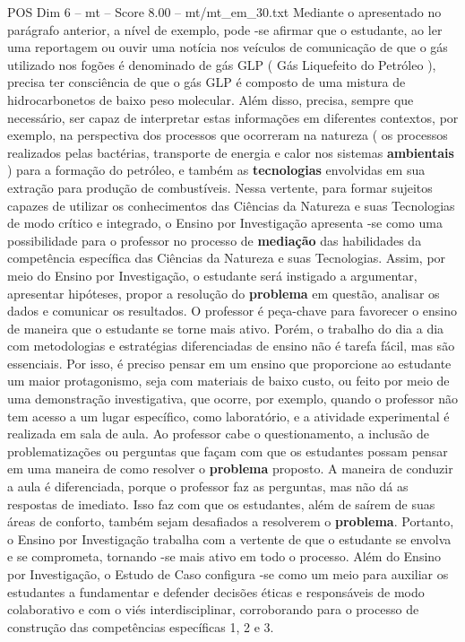 \begin{textsample}{POS Dim 6 – mt – Score 8.00 – mt/mt\_em\_30.txt}
Mediante o apresentado no parágrafo anterior, a nível de exemplo, pode -se afirmar que o estudante, ao ler uma reportagem ou ouvir uma notícia nos veículos de comunicação de que o gás utilizado nos fogões é denominado de gás GLP ( Gás Liquefeito do Petróleo ), precisa ter consciência de que o gás GLP é composto de uma mistura de hidrocarbonetos de baixo peso molecular.
Além disso, precisa, sempre que necessário, ser capaz de interpretar estas informações em diferentes contextos, por exemplo, na perspectiva dos processos que ocorreram na natureza ( os processos realizados pelas bactérias, transporte de energia e calor nos sistemas \textbf{ambientais} ) para a formação do petróleo, e também as \textbf{tecnologias} envolvidas em sua extração para produção de combustíveis.
Nessa vertente, para formar sujeitos capazes de utilizar os conhecimentos das Ciências da Natureza e suas Tecnologias de modo crítico e integrado, o Ensino por Investigação apresenta -se como uma possibilidade para o professor no processo de \textbf{mediação} das habilidades da competência específica das Ciências da Natureza e suas Tecnologias.
Assim, por meio do Ensino por Investigação, o estudante será instigado a argumentar, apresentar hipóteses, propor a resolução do \textbf{problema} em questão, analisar os dados e comunicar os resultados.
O professor é peça-chave para favorecer o ensino de maneira que o estudante se torne mais ativo.
Porém, o trabalho do dia a dia com metodologias e estratégias diferenciadas de ensino não é tarefa fácil, mas são essenciais.
Por isso, é preciso pensar em um ensino que proporcione ao estudante um maior protagonismo, seja com materiais de baixo custo, ou feito por meio de uma demonstração investigativa, que ocorre, por exemplo, quando o professor não tem acesso a um lugar específico, como laboratório, e a atividade experimental é realizada em sala de aula.
Ao professor cabe o questionamento, a inclusão de problematizações ou perguntas que façam com que os estudantes possam pensar em uma maneira de como resolver o \textbf{problema} proposto.
A maneira de conduzir a aula é diferenciada, porque o professor faz as perguntas, mas não dá as respostas de imediato.
Isso faz com que os estudantes, além de saírem de suas áreas de conforto, também sejam desafiados a resolverem o \textbf{problema}.
Portanto, o Ensino por Investigação trabalha com a vertente de que o estudante se envolva e se comprometa, tornando -se mais ativo em todo o processo.
Além do Ensino por Investigação, o Estudo de Caso configura -se como um meio para auxiliar os estudantes a fundamentar e defender decisões éticas e responsáveis de modo colaborativo e com o viés interdisciplinar, corroborando para o processo de construção das competências específicas 1, 2 e 3.

\end{textsample}
